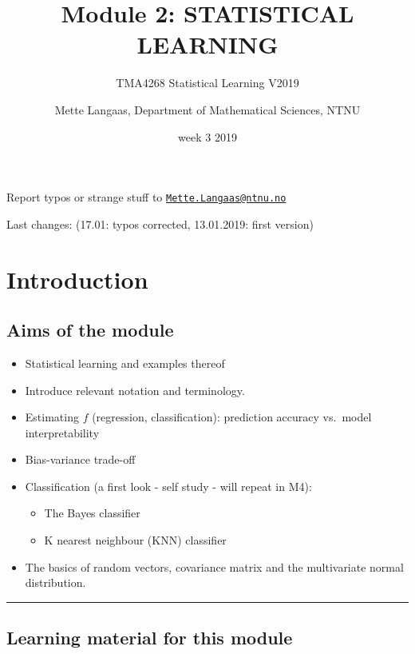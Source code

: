 \documentclass[]{article}
\title{Module 2: STATISTICAL LEARNING}
\subtitle{TMA4268 Statistical Learning V2019}
\author{Mette Langaas, Department of Mathematical Sciences, NTNU}
\date{week 3 2019}
\providecommand{\tightlist}{%
  \setlength{\itemsep}{0pt}\setlength{\parskip}{0pt}}
\begin{document}
\maketitle

{
\setcounter{tocdepth}{2}
\tableofcontents
}
Report typos or strange stuff to
\href{mailto:Mette.Langaas@ntnu.no}{\nolinkurl{Mette.Langaas@ntnu.no}}

Last changes: (17.01: typos corrected, 13.01.2019: first version)

\hypertarget{introduction}{%
\section{Introduction}\label{introduction}}

\hypertarget{aims-of-the-module}{%
\subsection{Aims of the module}\label{aims-of-the-module}}

\begin{itemize}
\tightlist
\item
  Statistical learning and examples thereof
\item
  Introduce relevant notation and terminology.
\item
  Estimating \(f\) (regression, classification): prediction accuracy
  vs.~model interpretability
\item
  Bias-variance trade-off
\item
  Classification (a first look - self study - will repeat in M4):

  \begin{itemize}
  \tightlist
  \item
    The Bayes classifier
  \item
    K nearest neighbour (KNN) classifier
  \end{itemize}
\item
  The basics of random vectors, covariance matrix and the multivariate
  normal distribution.
\end{itemize}

\begin{center}\rule{0.5\linewidth}{\linethickness}\end{center}

\hypertarget{learning-material-for-this-module}{%
\subsection{Learning material for this
module}\label{learning-material-for-this-module}}
\end{document}
